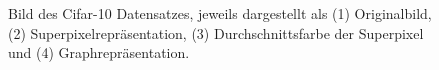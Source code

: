 \begin{figure}[t]
\centering
{}
  \caption[\gls{Cifar}-10]{Bild des \gls{Cifar}-10 Datensatzes, jeweils dargestellt als (1) Originalbild, (2) Superpixelrepräsentation, (3) Durchschnittsfarbe der Superpixel und (4) Graphrepräsentation.}
\label{fig:cifar_10}
\end{figure}
